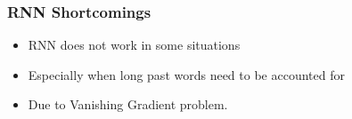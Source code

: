     



\begin{frame}[fragile] \frametitle{RNN Shortcomings}
\begin{itemize}
\item RNN does not work in some situations
\item Especially when long past words need to be accounted for
\item Due to Vanishing Gradient problem.
\end{itemize}
\end{frame}
